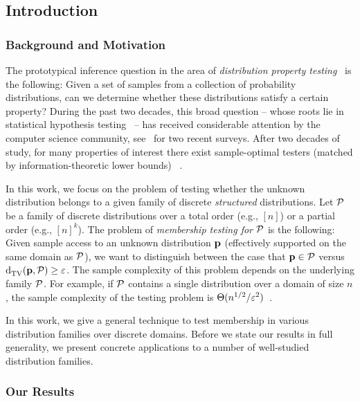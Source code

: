 \subsection{Introduction}  \label{sec:intro}
\subsubsection{Background and Motivation} \label{ssec:background}

The prototypical inference question in the area of \emph{distribution property testing}~\cite{BFRSW:00}
is the following: Given a set of samples from a collection of probability distributions, can we
determine whether these distributions satisfy a certain property?
During the past two decades, this broad
question -- whose roots lie in statistical hypothesis testing~\cite{NeymannPearson:33,Lehmann:2005:book} --
has received considerable attention by the computer science community,
see~\cite{Rubinfeld:12:Survey, Canonne:15:Survey} for two recent surveys.
After two decades of study, for many properties of interest there exist
sample-optimal testers (matched by information-theoretic lower bounds)
~\cite{Paninski:08, CDVV:14, VV:14, DKN:15, DK:16}.

In this work, we focus on the problem of testing whether the unknown distribution
belongs to a given family of discrete \emph{structured} distributions.
Let $\mathcal{P}$ be a family of discrete distributions over a total order (e.g., $[n]$)
or a partial order (e.g., $[n]^k$). 
The problem of \emph{membership testing for $\mathcal{P}$} is the following:
Given sample access to an unknown distribution $\mathbf{p}$ (effectively supported 
on the same domain as $\mathcal{P}$),
we want to distinguish between the case that $\mathbf{p} \in \mathcal{P}$ versus ${\operatorname{d}_{\textrm{TV}}^{}\!\left({\mathbf{p}, \mathcal{P}}\right)} \geq \varepsilon$. 
The sample complexity of this problem depends on the underlying family
$\mathcal{P}$. For example, if $\cal P$ contains a single distribution over a domain of size $n$,
the sample complexity of the testing problem is $\Theta(n^{1/2}/\varepsilon^2)$~\cite{CDVV:14, DKN:15}.

In this work, we give a general technique to test membership in various distribution families over discrete domains.
Before we state our results in full generality, we present concrete applications to 
a number of well-studied distribution families.

\subsubsection{Our Results} \label{ssec:results}

